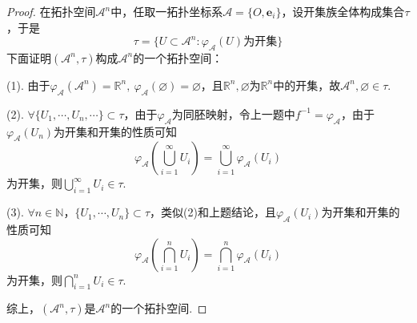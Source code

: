 \documentclass[12pt, a4paper, oneside]{ctexart}
\def\bd{\boldsymbol}        %
\def\R{\mathbb{R}}          %
\def\N{\mathbb{N}}          %
\begin{document}
\begin{proof}
    在拓扑空间$\mathscr{A}^n$中，任取一拓扑坐标系$\mathcal{A} = \{O,\bd{e}_i\}$，设开集族全体构成集合$\tau$，于是
    \begin{equation*}
        \tau = \{U\subset \mathscr{A}^n:\varphi_{\mathcal{A}}(U)\text{为开集}\}   
    \end{equation*}
    下面证明$(\mathscr{A}^n,\tau)$构成$\mathscr{A}^n$的一个拓扑空间：

    (1). 由于$\varphi_{\mathcal{A}}(\mathscr{A}^n) = \R^n,\ \varphi_{\mathcal{A}}(\varnothing) = \varnothing$，且$\R^n,\varnothing$为$\R^n$中的开集，故$\mathscr{A}^n,\varnothing\in\tau$.

    (2). $\forall \{U_1,\cdots,U_n,\cdots\}\subset\tau$，由于$\varphi_{\mathcal{A}}$为同胚映射，令上一题中$f^{-1} = \varphi_{\mathcal{A}}$，由于$\varphi_{\mathcal{A}}(U_n)$为开集和开集的性质可知
    \begin{equation*}
        \varphi_{\mathcal{A}}\left(\bigcup_{i=1}^\infty U_i\right) = \bigcup_{i=1}^\infty\varphi_{\mathcal{A}}(U_i)
    \end{equation*}
    为开集，则$\bigcup_{i=1}^\infty U_i\in \tau$.

    (3). $\forall n\in\N$，$\{U_1,\cdots,U_n\}\subset \tau$，类似(2)和上题结论，且$\varphi_{\mathcal{A}}(U_i)$为开集和开集的性质可知
    \begin{equation*}
        \varphi_{\mathcal{A}}\left(\bigcap_{i=1}^n U_i\right) = \bigcap_{i=1}^n\varphi_{\mathcal{A}}(U_i)
    \end{equation*}
    为开集，则$\bigcap_{i=1}^n U_i\in \tau$.

    综上，$(\mathscr{A}^n, \tau)$是$\mathscr{A}^n$的一个拓扑空间.
\end{proof}
\end{document}
